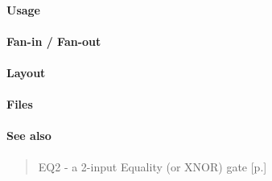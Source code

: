 \paragraph{Usage}

\paragraph{Fan-in / Fan-out}

\paragraph{Layout}

\paragraph{Files}

\paragraph{See also}
\begin{quote}
    EQ2 - a 2-input Equality (or XNOR) gate [p.\pageref{EQ2}]
\end{quote}
